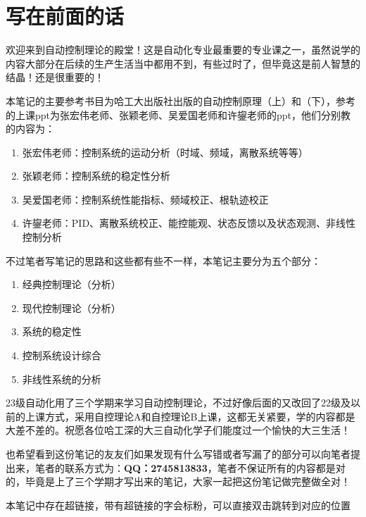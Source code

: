 \chapter{写在前面的话}

欢迎来到自动控制理论的殿堂！这是自动化专业最重要的专业课之一，虽然说学的内容大部分在后续的生产生活当中都用不到，有些过时了，但毕竟这是前人智慧的结晶！还是很重要的！

本笔记的主要参考书目为哈工大出版社出版的自动控制原理（上）和（下），参考的上课ppt为张宏伟老师、张颖老师、吴爱国老师和许鋆老师的ppt，他们分别教的内容为：
\begin{enumerate}
    \item 张宏伟老师：控制系统的运动分析（时域、频域，离散系统等等）
    \item 张颖老师：控制系统的稳定性分析
    \item 吴爱国老师：控制系统性能指标、频域校正、根轨迹校正
    \item 许鋆老师：PID、离散系统校正、能控能观、状态反馈以及状态观测、非线性控制分析
\end{enumerate}

不过笔者写笔记的思路和这些都有些不一样，本笔记主要分为五个部分：
\begin{enumerate}
    \item 经典控制理论（分析）
    \item 现代控制理论（分析）
    \item 系统的稳定性
    \item 控制系统设计综合
    \item 非线性系统的分析
\end{enumerate}

23级自动化用了三个学期来学习自动控制理论，不过好像后面的又改回了22级及以前的上课方式，采用自控理论A和自控理论B上课，这都无关紧要，学的内容都是大差不差的。祝愿各位哈工深的大三自动化学子们能度过一个愉快的大三生活！

也希望看到这份笔记的友友们如果发现有什么写错或者写漏了的部分可以向笔者提出来，笔者的联系方式为：\textbf{QQ：2745813833}，笔者不保证所有的内容都是对的，毕竟是上了三个学期才写出来的笔记，大家一起把这份笔记做完整做全对！

\begin{marker}
    本笔记中存在超链接，带有超链接的字会标粉，可以直接双击跳转到对应的位置
\end{marker}
